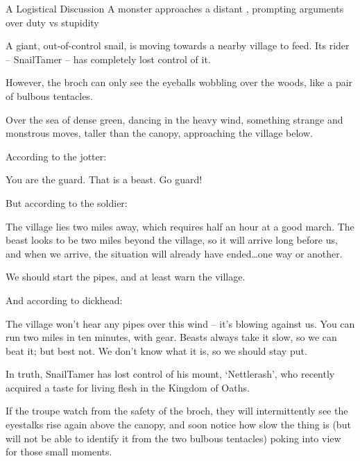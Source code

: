 

{A Logistical Discussion}%
{A monster approaches a distant , prompting arguments over duty vs stupidity}%

A giant, out-of-control snail, is moving towards a nearby \gls{village} to feed.
Its rider -- \gls{SnailTamer} -- has completely lost control of it.

However, the \gls{broch} can only see the eyeballs wobbling over the woods, like a pair of bulbous tentacles.

\begin{boxtext}
  Over the sea of dense green, dancing in the heavy wind, something strange and monstrous moves, taller than the canopy, approaching the \gls{village} below.
\end{boxtext}

According to the \gls{jotter}:

\begin{speechtext}
  You are the \gls{guard}.
  That is a beast.
  Go guard!
\end{speechtext}

But according to the \gls{soldier}:

\begin{speechtext}
  The \gls{village} lies two miles away, which requires half an hour at a good march.
  The beast looks to be two miles beyond the \gls{village}, so it will arrive long before us, and when we arrive, the situation will already have ended\ldots one way or another.

  We should start the pipes, and at least warn the \gls{village}.
\end{speechtext}

And according to \gls{dickhead}:

\begin{speechtext}
  The \gls{village} won't hear any pipes over this wind -- it's blowing against us.
  You can run two miles in ten minutes, with gear.
  Beasts always take it slow, so we can beat it; but best not.
  We don't know what it is, so we should stay put.
\end{speechtext}

In truth, \gls{SnailTamer} has lost control of his mount, `Nettlerash', who recently acquired a taste for living flesh in the Kingdom of Oaths.

If the troupe watch from the safety of the \gls{broch},
they will intermittently see the eyestalks rise again above the canopy, and soon notice how slow the thing is (but will not be able to identify it from the two bulbous tentacles) poking into view for those small moments.

